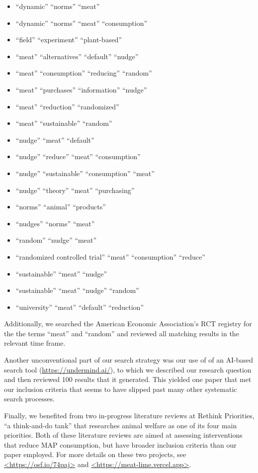 \documentclass[sn-nature,referee,pdflatex]{sn-jnl}
\providecommand{\tightlist}{%
  \setlength{\itemsep}{0pt}\setlength{\parskip}{0pt}}
\begin{document}
\begin{itemize}
\tightlist
\item
  ``dynamic'' ``norms'' ``meat''
\item
  ``dynamic'' ``norms'' ``meat'' ``consumption''
\item
  ``field'' ``experiment'' ``plant-based''
\item
  ``meat'' ``alternatives'' ``default'' ``nudge''
\item
  ``meat'' ``consumption'' ``reducing'' ``random''
\item
  ``meat'' ``purchases'' ``information'' ``nudge''
\item
  ``meat'' ``reduction'' ``randomized''
\item
  ``meat'' ``sustainable'' ``random''
\item
  ``nudge'' ``meat'' ``default''
\item
  ``nudge'' ``reduce'' ``meat'' ``consumption''
\item
  ``nudge'' ``sustainable'' ``consumption'' ``meat''
\item
  ``nudge'' ``theory'' ``meat'' ``purchasing''
\item
  ``norms'' ``animal'' ``products''
\item
  ``nudges'' ``norms'' ``meat''
\item
  ``random'' ``nudge'' ``meat''
\item
  ``randomized controlled trial'' ``meat'' ``consumption'' ``reduce''
\item
  ``sustainable'' ``meat'' ``nudge''
\item
  ``sustainable'' ``meat'' ``nudge'' ``random''
\item
  ``university'' ``meat'' ``default'' ``reduction''
\end{itemize}

Additionally, we searched the American Economic Association's RCT
registry for the the terms ``meat'' and ``random'' and reviewed all
matching results in the relevant time frame.

Another unconventional part of our search strategy was our use of of an
AI-based search tool (\url{https://undermind.ai/}), to which we
described our research question and then reviewed 100 results that it
generated. This yielded one paper that met our inclusion criteria
\citep{mattson2020} that seems to have slipped past many other
systematic search processes.

Finally, we benefited from two in-progress literature reviews at Rethink
Priorities, ``a think-and-do tank'' that researches animal welfare as
one of its four main priorities. Both of these literature reviews are
aimed at assessing interventions that reduce MAP consumption, but have
broader inclusion criteria than our paper employed. For more details on
these two projects, see \url{<https://osf.io/74paj>} and
\url{<https://meat-lime.vercel.app>}.
\end{document}
